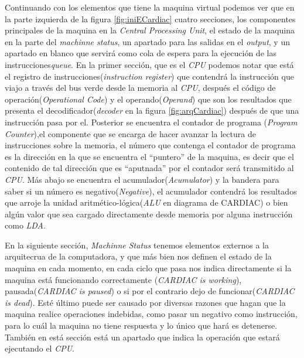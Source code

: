 \documentclass[letterpaper,12pt,oneside]{book}
\begin{document}
	

	Continuando con los elementos que tiene la maquina virtual podemos ver que en la parte izquierda de la figura \ref{fig:iniECardiac}  cuatro secciones, los
	componentes principales de la maquina en la
	\textit{Central Processing Unit}, el estado de la maquina en la parte del \textit{machinne status}, un apartado para las salidas en el \textit{output}, y un apartado en 
	blanco que servirá como cola de espera para la ejecución de las instrucciones\textit{queue}. En la primer sección, que es el \textit{CPU} podemos notar que está el
	registro de instrucciones(\textit{instruction register}) que contendrá la instrucción que viajo a través del bus verde desde la memoria al \textit{CPU}, después el 
	código de operación(\textit{Operational Code}) y el operando(\textit{Operand}) que son los resultados que presenta el decodificador(\textit{decoder} en la figura
	\ref{fig:arqCardiac}) después de que una instrucción pasa por el. Posterior se encuentra el contador de programa (\textit{Program Counter}),el componente que se 
	encarga de hacer avanzar la lectura de instrucciones sobre la memoria, el número que contenga el contador de programa es la dirección en la que se encuentra
	el ``puntero'' de la maquina, es decir que el contenido de tal dirección que es ``aputnada'' por el contador será transmitido al \textit{CPU}. Más abajo se
	encuentra el acumulador(\textit{Acumulator}) y la bandera para saber si un número es negativo(\textit{Negative}), el acumulador contendrá los resultados que arroje
	la unidad aritmético-lógica(\textit{ALU} en diagrama de CARDIAC) o bien algún valor que sea cargado directamente desde memoria por alguna instrucción como \textit{LDA}.                                                                                                                                                                                                                                                                                                                                                                                                                                                                                                                                                                                                          
	
	En la siguiente sección, \textit{Machinne Status} tenemos elementos externos a la arquitecrua de la computadora, y que más bien nos definen el
	estado de la maquina en cada momento, en cada ciclo que pasa nos indica directamente si la maquina está funcionando correctamente (\textit{CARDIAC is working}),
	pausada(\textit{CARDIAC is paused}) o si por el contrario dejo de funcionar(\textit{CARDIAC is dead}). Esté último puede ser causado por diversas razones
	que hagan que la maquina realice operaciones indebidas, como pasar un negativo como instrucción, para lo cuál la maquina no tiene respuesta
	y lo único que hará es detenerse. También en está sección está un apartado que indica la operación que estará ejecutando el \textit{CPU}.
	
\end{document}
